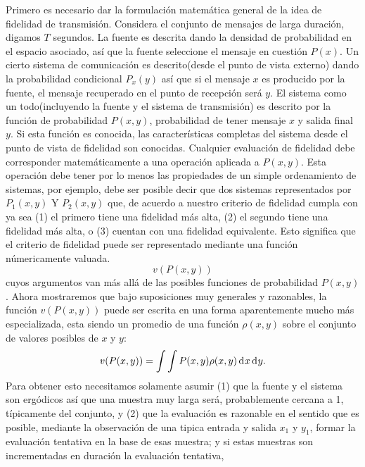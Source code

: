 Primero es necesario dar la formulaci\'on matem\'atica general de la
idea de fidelidad de transmisi\'on. Considera el conjunto de mensajes
de larga duraci\'on, digamos $T$ segundos. La fuente es descrita dando
la densidad de probabilidad en el espacio asociado, as\'i que la
fuente seleccione el mensaje en cuesti\'on $P(x)$. Un cierto sistema
de comunicaci\'on es descrito(desde el punto de vista externo) dando
la probabilidad condicional $P_{x}(y)$ as\'i que si el mensaje $x$ es
producido por la fuente, el mensaje recuperado en el punto de
recepci\'on ser\'a $y$. El sistema como un todo(incluyendo la fuente y
el sistema de transmisi\'on) es descrito por la funci\'on de
probabilidad $P(x, y)$, probabilidad de tener mensaje $x$ y salida
final $y$. Si esta funci\'on es conocida, las caracter\'isticas
completas del sistema desde el punto de vista de fidelidad son
conocidas. Cualquier evaluaci\'on de fidelidad debe corresponder
matem\'aticamente a una operaci\'on aplicada a $P(x, y)$. Esta
operaci\'on debe tener por lo menos las propiedades de un simple
ordenamiento de sistemas, por ejemplo, debe ser posible decir que dos
sistemas representados por $P_{1}(x, y)$ Y $P_{2}(x, y)$ que, de
acuerdo a nuestro criterio de fidelidad cumpla con ya sea (1) el
primero tiene una fidelidad m\'as alta, (2) el segundo tiene una
fidelidad m\'as alta, o (3) cuentan con una fidelidad
equivalente. Esto significa que el criterio de fidelidad puede ser
representado mediante una funci\'on n\'umericamente valuada.
\begin{equation} v(P(x,y)) \end{equation}
cuyos argumentos van m\'as all\'a de las posibles funciones de
probabilidad $P(x,y)$. Ahora mostraremos que bajo suposiciones muy
generales y razonables, la funci\'on $v(P(x,y))$ puede ser escrita en
una forma aparentemente mucho m\'as especializada, esta siendo un
promedio de una funci\'on $\rho(x,y)$ sobre el conjunto de valores
posibles de $x$ y $y$:
\begin{equation} 
v(P(x,y)) = \int \int P(x,y) \rho(x,y) \diff x  \diff y . 
\end{equation}
Para obtener esto necesitamos solamente asumir (1) que la fuente y el
sistema son erg\'odicos as\'i que una muestra muy larga ser\'a,
probablemente cercana a 1, t\'ipicamente del conjunto, y (2) que la
evaluaci\'on es razonable en el sentido que es posible, mediante la
observaci\'on de una tipica entrada y salida $x_{1}$ y $y_{1}$, formar
la evaluaci\'on tentativa en la base de esas muestra; y si estas
muestras son incrementadas en duraci\'on la evaluaci\'on tentativa,
